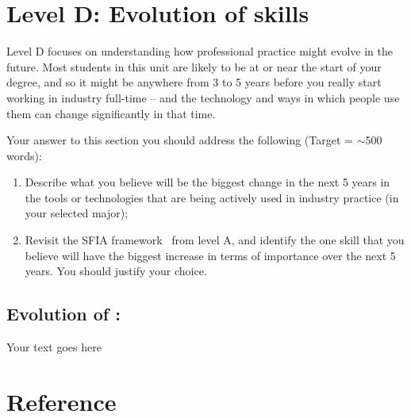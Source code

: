 \documentclass[a4paper, 11pt]{report}
\begin{document}

\newpage
\section{Level D: Evolution of skills}

Level D focuses on understanding how professional practice might evolve in the future. Most students in this unit are likely to be at or near the start of your degree, and so it might be anywhere from 3 to 5 years before you really start working in industry full-time -- and the technology and ways in which people use them can change significantly in that time. 

Your answer to this section you should address the following (Target = $\sim$500 words):
\begin{enumerate}
	\item Describe what you believe will be the biggest change in the next 5 years in the tools or technologies that are being actively used in industry practice (in your selected major);
	\item Revisit the SFIA framework~\cite{sfia} from level A, and identify the one skill that you believe will have the biggest increase in terms of importance over the next 5 years. You should justify your choice.
\end{enumerate}


\subsection{Evolution of \majA: \studA}

Your text goes here






\newpage
\section{Reference}
\cite{gitscm2023}



\end{document}

